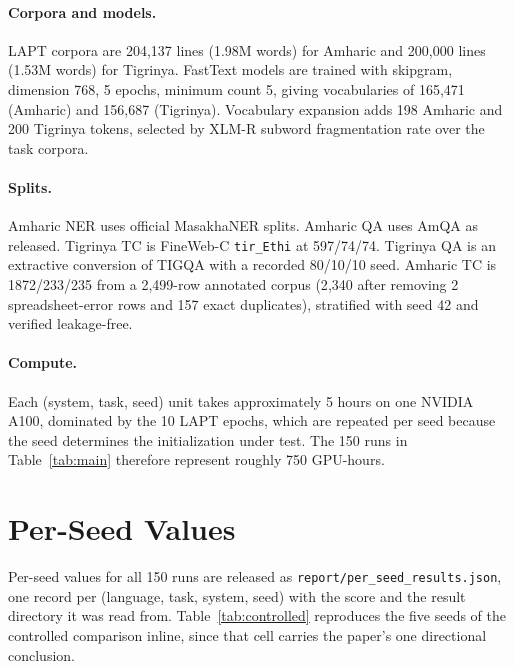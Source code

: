 \documentclass[11pt]{article}
\begin{document}
\paragraph{Corpora and models.} LAPT corpora are 204{,}137 lines (1.98M
words) for Amharic and 200{,}000 lines (1.53M words) for Tigrinya. FastText
models are trained with skipgram, dimension 768, 5 epochs, minimum count 5,
giving vocabularies of 165{,}471 (Amharic) and 156{,}687 (Tigrinya).
Vocabulary expansion adds 198 Amharic and 200 Tigrinya tokens, selected by
XLM-R subword fragmentation rate over the task corpora.

\paragraph{Splits.} Amharic NER uses official MasakhaNER splits. Amharic QA
uses AmQA as released. Tigrinya TC is FineWeb-C \texttt{tir\_Ethi} at
597/74/74. Tigrinya QA is an extractive conversion of TIGQA with a recorded
80/10/10 seed. Amharic TC is 1872/233/235 from a 2{,}499-row annotated corpus
(2{,}340 after removing 2 spreadsheet-error rows and 157 exact duplicates),
stratified with seed 42 and verified leakage-free.

\paragraph{Compute.} Each (system, task, seed) unit takes approximately 5
hours on one NVIDIA A100, dominated by the 10 LAPT epochs, which are repeated
per seed because the seed determines the initialization under test. The 150
runs in Table~\ref{tab:main} therefore represent roughly 750 GPU-hours.

\section{Per-Seed Values}
\label{app:seeds}

Per-seed values for all 150 runs are released as
\texttt{report/per\_seed\_results.json}, one record per
(language, task, system, seed) with the score and the result directory it was
read from. Table~\ref{tab:controlled} reproduces the five seeds of the
controlled comparison inline, since that cell carries the paper's one
directional conclusion.
\end{document}
